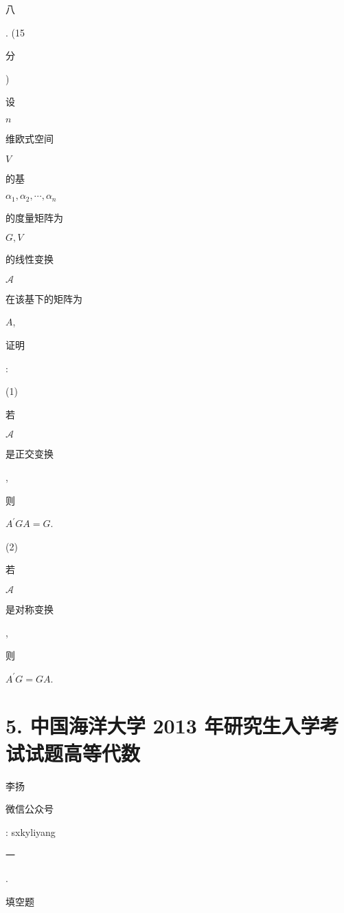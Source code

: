 \documentclass[10pt]{article}
\begin{document}
\begin{CJK}{UTF8}{mj}八\end{CJK}. (15 \begin{CJK}{UTF8}{mj}分\end{CJK}) \begin{CJK}{UTF8}{mj}设\end{CJK} $n$ \begin{CJK}{UTF8}{mj}维欧式空间\end{CJK} $V$ \begin{CJK}{UTF8}{mj}的基\end{CJK} $\alpha_{1}, \alpha_{2}, \cdots, \alpha_{n}$ \begin{CJK}{UTF8}{mj}的度量矩阵为\end{CJK} $G, V$ \begin{CJK}{UTF8}{mj}的线性变换\end{CJK} $\mathscr{A}$ \begin{CJK}{UTF8}{mj}在该基下的矩阵为\end{CJK} $A$, \begin{CJK}{UTF8}{mj}证明\end{CJK}:

(1) \begin{CJK}{UTF8}{mj}若\end{CJK} $\mathscr{A}$ \begin{CJK}{UTF8}{mj}是正交变换\end{CJK}, \begin{CJK}{UTF8}{mj}则\end{CJK} $A^{\prime} G A=G$.

(2) \begin{CJK}{UTF8}{mj}若\end{CJK} $\mathscr{A}$ \begin{CJK}{UTF8}{mj}是对称变换\end{CJK}, \begin{CJK}{UTF8}{mj}则\end{CJK} $A^{\prime} G=G A$.

\section{5. 中国海洋大学 2013 年研究生入学考试试题高等代数}
\begin{CJK}{UTF8}{mj}李扬\end{CJK}

\begin{CJK}{UTF8}{mj}微信公众号\end{CJK}: sxkyliyang

\begin{CJK}{UTF8}{mj}一\end{CJK}. \begin{CJK}{UTF8}{mj}填空题\end{CJK}
\end{document}
